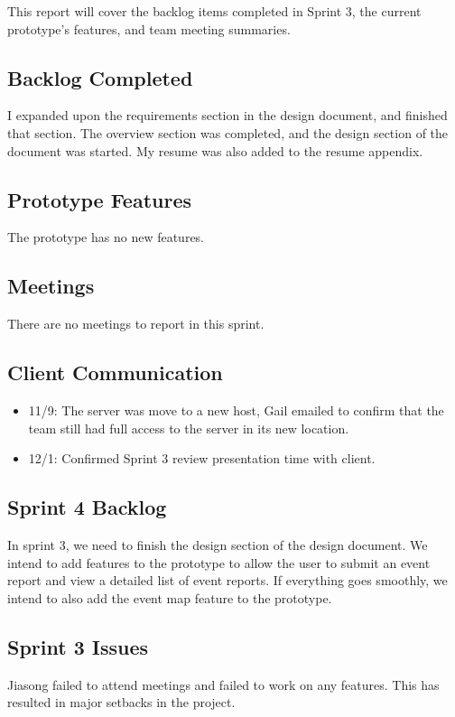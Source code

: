
This report will cover the backlog items completed in Sprint 3, the current prototype's features, and team meeting summaries. 

 \subsection{Backlog Completed}
 I expanded upon the requirements section in the design document, and finished that section. The overview section was completed, and the design section of the document was started. My resume was also added to the resume appendix.
 
 \subsection{Prototype Features}
 The prototype has no new features.
 
 \subsection{Meetings}
There are no meetings to report in this sprint.

\subsection{Client Communication}
\begin{itemize}
\item11/9: The server was move to a new host, Gail emailed to confirm that the team still had full access to the server in its new location.
\item12/1: Confirmed Sprint 3 review presentation time with client.
\end{itemize}

\subsection{Sprint 4 Backlog}
In sprint 3, we need to finish the design section of the design document. We intend to add features to the prototype to allow the user to submit an event report and view a detailed list of event reports. If everything goes smoothly, we intend to also add the event map feature to the prototype.

\subsection{Sprint 3 Issues}
Jiasong failed to attend meetings and failed to work on any features. This has resulted in major setbacks in the project.